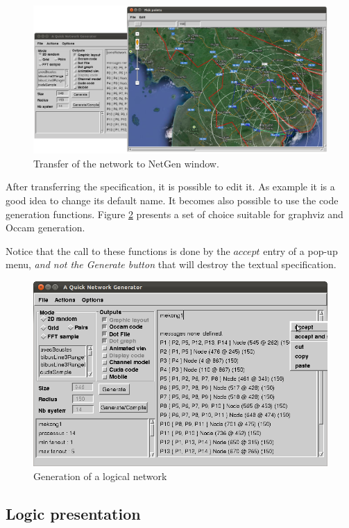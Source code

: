 \documentclass[times,a4paper]{book}
\begin{document}
\begin{figure}[hbtp]
\begin{center} 
\includegraphics[width=12cm]{BuildNet1.png}
\caption{Transfer of the network to NetGen window.
}
\label{fig:BuildNet1}
\end{center}
\end{figure}

After transferring the specification, it is possible to edit it.
As example it is a good idea to change its default name.
It becomes also possible to use the code generation functions.
Figure 
\ref{fig:BuildNet2} presents a set of choice suitable for graphviz 
and Occam generation.

Notice that the call to these functions is done by the $accept$ entry
of a pop-up menu, {\sl and not the Generate button} that will destroy
the textual specification.
\begin{figure}[hbtp]
\begin{center} 
\includegraphics[width=12cm]{BuildNet2.png}
\caption{Generation of a logical network
}
\label{fig:BuildNet2}
\end{center}
\end{figure}


\subsection{Logic presentation}
\end{document}
